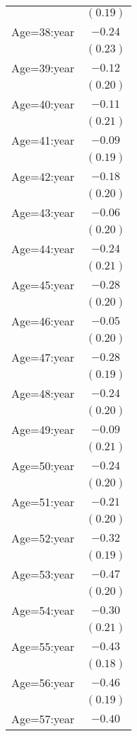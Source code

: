 \documentclass[fullpage]{paper}
\begin{document}
\begin{center}
\begin{longtable}{l c }
            & $(0.19)$ \\
Age=38:year & $-0.24$  \\
            & $(0.23)$ \\
Age=39:year & $-0.12$  \\
            & $(0.20)$ \\
Age=40:year & $-0.11$  \\
            & $(0.21)$ \\
Age=41:year & $-0.09$  \\
            & $(0.19)$ \\
Age=42:year & $-0.18$  \\
            & $(0.20)$ \\
Age=43:year & $-0.06$  \\
            & $(0.20)$ \\
Age=44:year & $-0.24$  \\
            & $(0.21)$ \\
Age=45:year & $-0.28$  \\
            & $(0.20)$ \\
Age=46:year & $-0.05$  \\
            & $(0.20)$ \\
Age=47:year & $-0.28$  \\
            & $(0.19)$ \\
Age=48:year & $-0.24$  \\
            & $(0.20)$ \\
Age=49:year & $-0.09$  \\
            & $(0.21)$ \\
Age=50:year & $-0.24$  \\
            & $(0.20)$ \\
Age=51:year & $-0.21$  \\
            & $(0.20)$ \\
Age=52:year & $-0.32$  \\
            & $(0.19)$ \\
Age=53:year & $-0.47$  \\
            & $(0.20)$ \\
Age=54:year & $-0.30$  \\
            & $(0.21)$ \\
Age=55:year & $-0.43$  \\
            & $(0.18)$ \\
Age=56:year & $-0.46$  \\
            & $(0.19)$ \\
Age=57:year & $-0.40$  \\

\end{longtable}
\end{center}
\end{document}

